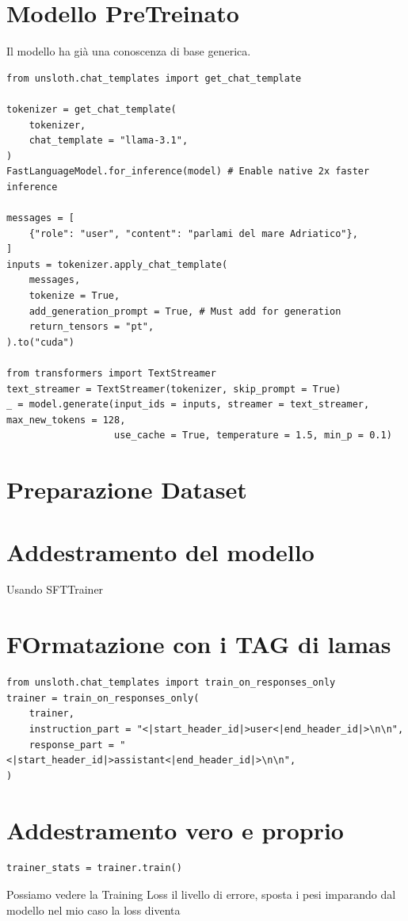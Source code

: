 \documentclass[12pt,a4paper,openright,twoside]{book}
\begin{document}
\section{Modello PreTreinato}
Il modello ha già una conoscenza di base generica.
\begin{lstlisting}
from unsloth.chat_templates import get_chat_template

tokenizer = get_chat_template(
    tokenizer,
    chat_template = "llama-3.1",
)
FastLanguageModel.for_inference(model) # Enable native 2x faster inference

messages = [
    {"role": "user", "content": "parlami del mare Adriatico"},
]
inputs = tokenizer.apply_chat_template(
    messages,
    tokenize = True,
    add_generation_prompt = True, # Must add for generation
    return_tensors = "pt",
).to("cuda")

from transformers import TextStreamer
text_streamer = TextStreamer(tokenizer, skip_prompt = True)
_ = model.generate(input_ids = inputs, streamer = text_streamer, max_new_tokens = 128,
                   use_cache = True, temperature = 1.5, min_p = 0.1)
\end{lstlisting}

\section{Preparazione Dataset}

\section{Addestramento del modello}
Usando SFTTrainer
\section{FOrmatazione con i TAG di lamas}
\begin{lstlisting}
from unsloth.chat_templates import train_on_responses_only
trainer = train_on_responses_only(
    trainer,
    instruction_part = "<|start_header_id|>user<|end_header_id|>\n\n",
    response_part = "<|start_header_id|>assistant<|end_header_id|>\n\n",
)
\end{lstlisting}
\section{Addestramento vero e proprio}
\begin{lstlisting}
trainer_stats = trainer.train()
\end{lstlisting}
Possiamo vedere la Training Loss
il livello di errore, sposta i pesi imparando dal modello
nel mio caso la loss diventa 
\end{document}
